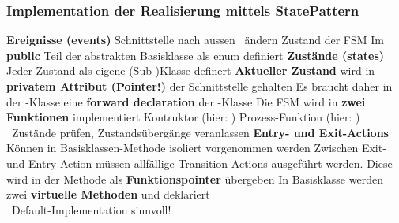 


\subsubsection{Implementation der Realisierung mittels StatePattern}

\begin{outline}
    \1 \textbf{Ereignisse (events)}
        \2 Schnittstelle nach aussen \textrightarrow\ ändern Zustand der FSM
        \2 Im \textbf{public} Teil der abstrakten Basisklasse als enum definiert
    \1 \textbf{Zustände (states)}
        \2 Jeder Zustand als eigene (Sub-)Klasse definert
    \1 \textbf{Aktueller Zustand}  wird in \textbf{privatem Attribut (Pointer!)} der Schnittstelle gehalten
        \2 Es braucht daher in der -Klasse eine \textbf{forward declaration} der -Klasse
    \1 Die FSM wird in \textbf{zwei Funktionen} implementiert
        \2 Kontruktor (hier: )
        \2 Prozess-Funktion (hier: ) \\
            \textrightarrow\ Zustände prüfen, Zustandsübergänge veranlassen
    \1 \textbf{Entry- und Exit-Actions}
        \2 Können in Basisklassen-Methode  isoliert vorgenommen werden
        \2 Zwischen Exit- und Entry-Action müssen allfällige Transition-Actions ausgeführt werden. Diese wird in der Methode 
             als \textbf{Funktionspointer} übergeben
        \2 In Basisklasse werden zwei \textbf{virtuelle Methoden}  und  deklariert \\
            \textrightarrow\ Default-Implementation sinnvoll!
\end{outline}




